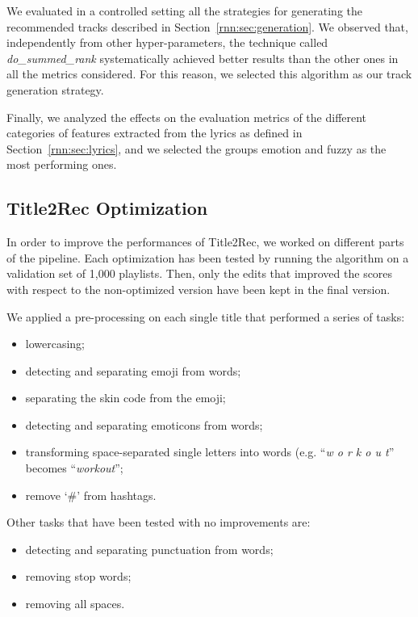 We evaluated in a controlled setting all the strategies for generating the recommended tracks described in Section~\ref{rnn:sec:generation}. We observed that, independently from other hyper-parameters, the technique called \textit{do\_summed\_rank} systematically achieved better results than the other ones in all the metrics considered. For this reason, we selected this algorithm as our track generation strategy.

Finally, we analyzed the effects on the evaluation metrics of the different categories of features extracted from the lyrics as defined in Section~\ref{rnn:sec:lyrics}, and we selected the groups emotion and fuzzy as the most performing ones.

\subsection{Title2Rec Optimization}
In order to improve the performances of Title2Rec, we worked on different parts of the pipeline. Each optimization has been tested by running the algorithm on a validation set of 1,000 playlists. Then, only the edits that improved the scores with respect to the non-optimized version have been kept in the final version.

We applied a pre-processing on each single title that performed a series of tasks:

\begin{itemize}
\item lowercasing;
\item detecting and separating emoji from words;
\item separating the skin code from the emoji;
\item detecting and separating emoticons from words;
\item transforming space-separated single letters into words (e.g. ``\textit{w o r k o u t}'' becomes ``\textit{workout}'';
\item remove `\#' from hashtags.
\end{itemize}

Other tasks that have been tested with no improvements are:

\begin{itemize}
\item detecting and separating punctuation from words;
\item removing stop words;
\item removing all spaces.
\end{itemize}

